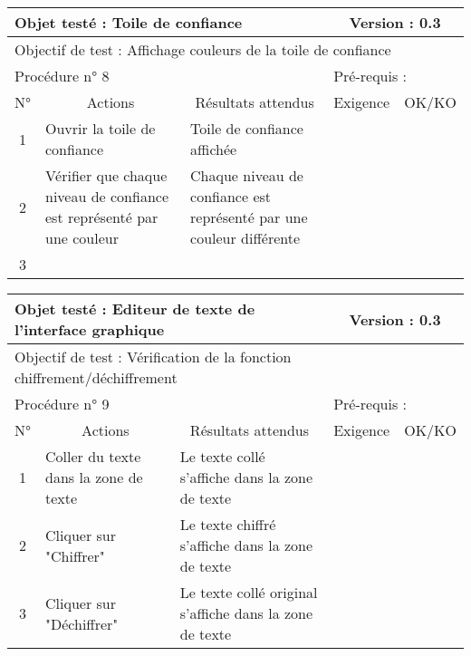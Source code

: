 \documentclass{../res/univ-projet}
\begin{document}
\begin{center}
    \begin{tabular}{|c|p{5cm}|p{5cm}|p{1.5cm}|p{1.5cm}|}
      \hline
      \multicolumn{3}{|l|}{Objet testé : Toile de confiance} & \multicolumn{2}{c|}{Version : 0.3}\\ \hline
      \multicolumn{5}{|l|}{Objectif de test : Affichage couleurs de la toile de confiance}\\ \hline
      \multicolumn{3}{|l|}{Procédure n° 8} & \multicolumn{2}{p{3cm}|}{Pré-requis : }\\ \hline
      \multicolumn{1}{|c|}{N°} & \multicolumn{1}{c|}{Actions} & \multicolumn{1}{c|}{Résultats attendus} & 
      \multicolumn{1}{c|}{Exigence} & \multicolumn{1}{c|}{OK/KO}\\ \hline
      1 & Ouvrir la toile de confiance & Toile de confiance affichée &  & \\
      2 & Vérifier que chaque niveau de confiance est représenté par une couleur & Chaque niveau de confiance est représenté par une couleur différente &  & \\
      3 &  &  &  & \\ \hline
    \end{tabular}
    \vskip 2.2cm
    
    
    \begin{tabular}{|c|p{5cm}|p{5cm}|p{1.5cm}|p{1.5cm}|}
      \hline
      \multicolumn{3}{|l|}{Objet testé : Editeur de texte de l'interface graphique} & \multicolumn{2}{c|}{Version : 0.3}\\ \hline
      \multicolumn{5}{|l|}{Objectif de test : Vérification de la fonction chiffrement/déchiffrement}\\ \hline
      \multicolumn{3}{|l|}{Procédure n° 9} & \multicolumn{2}{p{3cm}|}{Pré-requis : }\\ \hline
      \multicolumn{1}{|c|}{N°} & \multicolumn{1}{c|}{Actions} & \multicolumn{1}{c|}{Résultats attendus} & 
      \multicolumn{1}{c|}{Exigence} & \multicolumn{1}{c|}{OK/KO}\\ \hline
      1 & Coller du texte dans la zone de texte & Le texte collé s'affiche dans la zone de texte &  & \\
      2 & Cliquer sur "Chiffrer" & Le texte chiffré s'affiche dans la zone de texte &  & \\
      3 & Cliquer sur "Déchiffrer" & Le texte collé original s'affiche dans la zone de texte &  & 
    \\ \hline
    \end{tabular}
    \vskip 2.2cm




\end{center}
\end{document}
